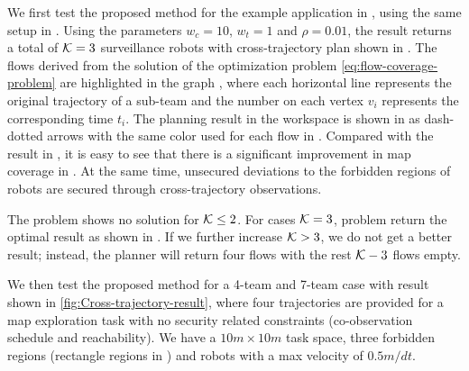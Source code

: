 \documentclass[10pt,twocolumn,twoside]{IEEEtran}
\begin{document}
We first test the proposed method for the example application in , using the same setup in . Using the parameters $w_{c}=10$, $w_{t}=1$ and $\rho = 0.01$, the result returns a total of $\mathcal{K}=3$ surveillance robots with cross-trajectory plan shown in . %
The flows derived from the solution of the optimization problem \eqref{eq:flow-coverage-problem} are highlighted in the graph , where each horizontal line represents the original trajectory of a sub-team and the number on each vertex $v_{i}$ represents the corresponding time $t_{i}$. The planning result in the workspace is shown in  as dash-dotted arrows with the same color used for each flow in . Compared with the result in , it is easy to see that there is a significant improvement in map coverage in . At the same time, unsecured deviations to the forbidden regions of robots are secured through cross-trajectory observations. 

The problem shows no solution for $\mathcal{K}\leq 2$. For cases $\mathcal{K}=3$, problem return the optimal result as shown in . If we further increase $\mathcal{K}>3$, we do not get a better result; instead, the planner will return four flows with the rest $\mathcal{K}-3$ flows empty. 

We then test the proposed method for a 4-team and 7-team case with result shown in \cref{fig:Cross-trajectory-result}, where four trajectories are provided for a map exploration task with no security related constraints (co-observation schedule and reachability). We have a $10m\times10m$ task space, three forbidden regions (rectangle regions in ) and robots with a max velocity of $0.5m/dt$. 
\end{document}

